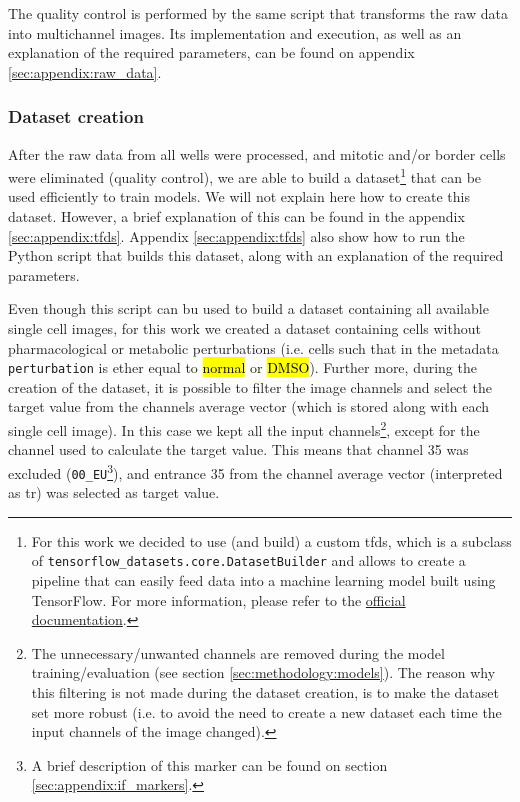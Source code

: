 The quality control is performed by the same script that transforms the raw data into multichannel images. Its implementation and execution, as well as an explanation of the required parameters, can be found on appendix \ref{sec:appendix:raw_data}.

\subsubsection{Dataset creation}

After the raw data from all wells were processed, and mitotic and/or border cells were eliminated (quality control), we are able to build a dataset\footnote{For this work we decided to use (and build) a custom \acrfull{tfds}, which is a subclass of \texttt{tensorflow\_datasets.core.DatasetBuilder} and allows to create a pipeline that can easily feed data into a machine learning model built using TensorFlow. For more information, please refer to the \href{https://www.tensorflow.org/datasets/add_dataset}{official documentation}.} that can be used efficiently to train models. We will not explain here how to create this dataset. However, a brief explanation of this can be found in the appendix \ref{sec:appendix:tfds}. Appendix \ref{sec:appendix:tfds} also show how to run the Python script that builds this dataset, along with an explanation of the required parameters.

Even though this script can bu used to build a dataset containing all available single cell images, for this work we created a dataset containing cells without pharmacological or metabolic perturbations (i.e. cells such that in the metadata \texttt{perturbation} is ether equal to \hl{normal} or \hl{DMSO}). Further more, during the creation of the dataset, it is possible to filter the image channels and select the target value from the channels average vector (which is stored along with each single cell image). In this case we kept all the input channels\footnote{The unnecessary/unwanted channels are removed during the model training/evaluation (see section \ref{sec:methodology:models}). The reason why this filtering is not made during the dataset creation, is to make the dataset set more robust (i.e. to avoid the need to create a new dataset each time the input channels of the image changed).}, except for the channel used to calculate the target value. This means that channel 35 was excluded (\texttt{00\_EU}\footnote{A brief description of this marker can be found on section \ref{sec:appendix:if_markers}.}), and entrance 35 from the channel average vector (interpreted as \gls{tr}) was selected as target value.

